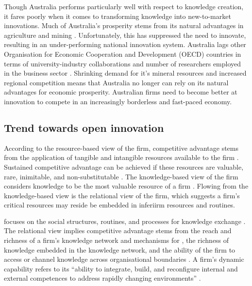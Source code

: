 Though Australia performs particularly well with respect to knowledge creation, it fares poorly when it comes to transforming knowledge into new-to-market innovations. Much of Australia's prosperity stems from its natural advantages in agriculture and mining \citep{leung2016view}. Unfortunately, this has suppressed the need to innovate, resulting in an under-performing national innovation system. Australia lags other Organisation for Economic Cooperation and Development (OECD) countries in terms of university-industry collaborations and number of researchers employed in the business sector \citep{dodgson2011changing,pettigrew2012australia,leung2016view}. Shrinking demand for it's mineral resources and increased regional competition means that Australia no longer can rely on its natural advantages for economic prosperity. Australian firms need to become better at innovation to compete in an increasingly borderless and fast-paced economy. \medskip

\subsection{Trend towards open innovation}

According to the resource-based view of the firm, competitive advantage stems from the application of tangible and intangible resources available to the firm \citep{wernerfelt1984resource,peteraf1993cornerstones}. Sustained competitive advantage can be achieved if these resources are valuable, rare, inimitable, and non-substitutable \citep{barney1991firm}. The knowledge-based view of the firm considers knowledge to be the most valuable resource of a firm \citep{grant1996toward}. Flowing from the knowledge-based view is the relational view of the firm, which suggests a firm's critical resources may reside be embedded in inferiirm resources and routines.

focuses on the social structures, routines, and processes for knowledge exchange \citep{grant1995knowledge,dyer1998relational,nahapiet1998social,tsai1998social}.  The relational view implies competitive advantage stems from the reach and richness of a firm's knowledge network and mechanisms for , the richness of knowledge embedded in the knowledge network, and the ability of the firm to access or channel knowledge across organisational boundaries \citep{gulati2011networks}. A firm's dynamic capability refers to its \enquote{ability to integrate, build, and reconfigure internal and external competences to address rapidly changing environments} \citep{teece2007explicating}. \medskip

